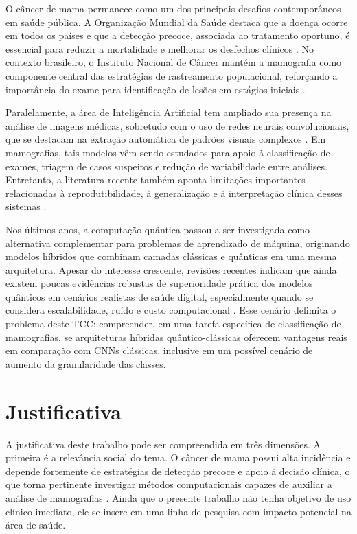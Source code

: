 \documentclass[
    12pt,
    openright,
    oneside,
    a4paper,
    english,
    brazil
]{abntex2}
\begin{document}
O câncer de mama permanece como um dos principais desafios contemporâneos em saúde pública. A Organização Mundial da Saúde destaca que a doença ocorre em todos os países e que a detecção precoce, associada ao tratamento oportuno, é essencial para reduzir a mortalidade e melhorar os desfechos clínicos \cite{WHO2025BreastCancer}. No contexto brasileiro, o Instituto Nacional de Câncer mantém a mamografia como componente central das estratégias de rastreamento populacional, reforçando a importância do exame para identificação de lesões em estágios iniciais \cite{INCA2025Rastreamento}.

Paralelamente, a área de Inteligência Artificial tem ampliado sua presença na análise de imagens médicas, sobretudo com o uso de redes neurais convolucionais, que se destacam na extração automática de padrões visuais complexos \cite{LeCun2015}. Em mamografias, tais modelos vêm sendo estudados para apoio à classificação de exames, triagem de casos suspeitos e redução de variabilidade entre análises. Entretanto, a literatura recente também aponta limitações importantes relacionadas à reprodutibilidade, à generalização e à interpretação clínica desses sistemas \cite{Bhalla2023MammographyReview}.

Nos últimos anos, a computação quântica passou a ser investigada como alternativa complementar para problemas de aprendizado de máquina, originando modelos híbridos que combinam camadas clássicas e quânticas em uma mesma arquitetura. Apesar do interesse crescente, revisões recentes indicam que ainda existem poucas evidências robustas de superioridade prática dos modelos quânticos em cenários realistas de saúde digital, especialmente quando se considera escalabilidade, ruído e custo computacional \cite{Gupta2025QMLDigitalHealth}. Esse cenário delimita o problema deste TCC: compreender, em uma tarefa específica de classificação de mamografias, se arquiteturas híbridas quântico-clássicas oferecem vantagens reais em comparação com CNNs clássicas, inclusive em um possível cenário de aumento da granularidade das classes.

\section{Justificativa}
\label{sec:justificativa}

A justificativa deste trabalho pode ser compreendida em três dimensões. A primeira é a relevância social do tema. O câncer de mama possui alta incidência e depende fortemente de estratégias de detecção precoce e apoio à decisão clínica, o que torna pertinente investigar métodos computacionais capazes de auxiliar a análise de mamografias \cite{WHO2025BreastCancer}. Ainda que o presente trabalho não tenha objetivo de uso clínico imediato, ele se insere em uma linha de pesquisa com impacto potencial na área de saúde.
\end{document}

